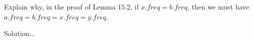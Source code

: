\item[\textbf{Exercise 15.3-1}]
Explain why, in the proof of Lemma 15.2, if $x.freq = b.freq$, then we must have
$a.freq = b.freq = x.freq = y.freq$. 

\Solution

Solution...
